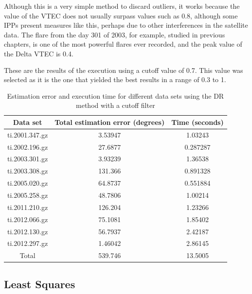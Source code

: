 Although this is a very simple method to discard outliers, it works because the value of the VTEC does not usually surpass values such as 0.8, although some IPPs present measures like this, perhaps due to other interferences in the satellite data. The flare from the day 301 of 2003, for example, studied in previous chapters, is one of the most powerful flares ever recorded, and the peak value of the Delta VTEC is 0.4.

These are the results of the execution using a cutoff value of 0.7. This value was selected as it is the one that yielded the best results in a range of 0.3 to 1.

\begin{table}[h!]
   	\centering
   	\def\arraystretch{1.2}
   	\begin{tabular}{|c c c|} 
   		\hline
   		Data set & Total estimation error (degrees) & Time (seconds) \\ [0.5ex] 
   		\hline\hline
   		ti.2001.347.gz & 3.53947 & 1.03243 \\
   		\hline
   		ti.2002.196.gz & 27.6877 & 0.287287 \\
   		\hline
   		ti.2003.301.gz & 3.93239 & 1.36538 \\
   		\hline
   		ti.2003.308.gz & 131.366 & 0.891328 \\
   		\hline
   		ti.2005.020.gz & 64.8737 & 0.551884 \\
   		\hline
   		ti.2005.258.gz & 48.7806 & 1.00214 \\
   		\hline
   		ti.2011.210.gz & 126.204 & 1.23266 \\
   		\hline
   		ti.2012.066.gz & 75.1081 & 1.85402 \\
   		\hline
   		ti.2012.130.gz & 56.7937 & 2.42187 \\
   		\hline
   		ti.2012.297.gz & 1.46042 & 2.86145 \\
   		\hline
   		\hline
   		Total & 539.746 & 13.5005 \\
   		\hline
   	\end{tabular}
   	\caption{Estimation error and execution time for different data sets using the DR method with a cutoff filter}
\end{table}

\subsection{Least Squares}


